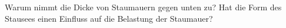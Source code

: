 Warum nimmt die Dicke von Staumauern gegen unten zu? Hat die Form des Stausees einen Einfluss auf die Belastung der Staumauer?
